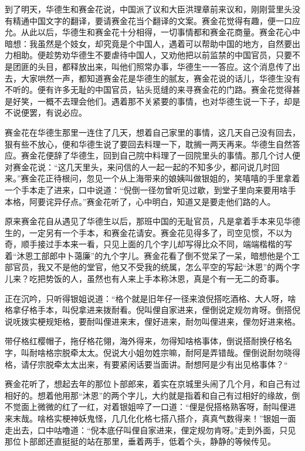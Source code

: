 \documentclass[12pt,UTF8]{ctexbook}
\begin{document}
{{{到了明天，华德生和赛金花说，中国派了议和大臣洪理章前来议和，刚刚营里头没有精通中国文字的翻译，要请赛金花当个翻译的文案。赛金花觉得有趣，便一口应允。从此以后，华德生和赛金花十分相得，一切事情都和赛金花商量。赛金花心中暗想：我虽然是个妓女，却究竟是个中国人，遇着可以帮助中国的地方，自然要出力相助。便趁势劝华德生不要虐待中国人，又劝他把以前监禁的中国官员，只要不是团匪的头目，都释放出来，叫他们照常办事，华德生一一答应。这个消息传了出去，大家哄然一声，都知道赛金花是华德生的腻友，赛金花说的话儿，华德生没有不听的。便有许多无耻的中国官员，钻头觅缝的来寻赛金花的门路。赛金花觉得甚是好笑，一概不去理会他们。遇着那不关紧要的事情，也对华德生说一下子，却是不说便罢，有说必应。

赛金花在华德生那里一连住了几天，想着自己家里的事情，这几天自己没有回去，狠有些不放心，便和华德生说了要回去料理一下，耽搁一两天再来。华德生自然答应。赛金花便辞了华德生，回到自己院中料理了一回院里头的事情。那几个讨人便对赛金花说：“这几天里头，来问信的人一起一起的不知多少，都问说几时回来。”赛金花正待根问，忽见一个从上海带来的娘姨叫做银姐的，笑嘻嘻的手里拿着一个手本走了进来，口中说道：“倪倒一径勿曾听见过歇，到堂子里向来要用啥手本格，阿要诧异仔点。”赛金花听了，心中明白，知道又是要走他们路的人。

原来赛金花自从遇见了华德生以后，那班中国的无耻官员，凡是拿着手本来见华德生的，一定另有一个手本，和赛金花请安。赛金花见得多了，司空见惯，不以为奇，顺手接过手本来一看，只见上面的几个字儿却写得比众不同，端端楷楷的写着“沐恩工部郎中卜蔼廉”的九个字儿。赛金花看了倒不觉呆了一呆，暗想他是个工部官员，我又不是他的堂官，他又不受我的统属，怎么平空的写起“沐恩”的两个字儿来？吃把势饭的人，虽然也有人来上手本称沐恩，真是个有一无二的奇事。

正在沉吟，只听得银姐说道：“格个就是旧年仔一径来浪倪搭吃酒格、大人呀，啥格拿仔格手本，叫倪拿进来拨耐看。倪叫俚自家进来，俚倒说定规勿肯呀。倒搭倪说呒拨实梗规矩格，要耐叫俚进来末，俚好进来，耐勿叫俚进来，俚勿好进来格。

带仔格红樱帽子，拖仔格花翎，海外得来，勿得知啥格事体，倒说搭耐换仔格名字，叫耐啥格宗脱牵太太。倪说大小姐勿姓宗嘛，耐阿是弄错哉。俚倒说耐勿晓得格，请仔宗脱牵太太出来，有要紧闲话要当面讲。耐想阿是少有出见格事体？“

赛金花听了，想起去年的那位卜部郎来，着实在京城里头闹了几个月，和自己有过相好的。想着他用那“沐恩”的两个字儿，大约就是指着和自己有过相好的缘故，倒不觉面上微微的红了一红，对着银姐啐了一口道：“俚是倪搭格熟客呀，耐叫俚进来末哉。啥格实梗神妖鬼怪，几几化化格七搭八搭介，真真气数得来！”银姐一面走出去，口中咕噜道：“倪本底仔叫俚自家进来，俚定规勿肯呀。”走到外面，只见那位卜部郎还直挺挺的站在那里，垂着两手，低着个头，静静的等候传见。

}}}
\end{document}
